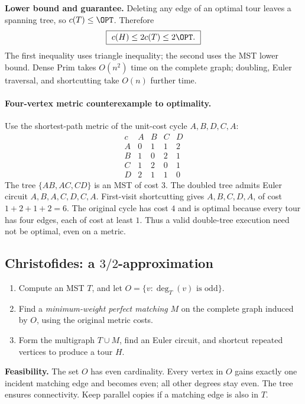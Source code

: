 \textbf{Lower bound and guarantee.} Deleting any edge of an optimal tour
leaves a spanning tree, so $c(T)\le\OPT$.  Therefore
\[
\boxed{\ c(H)\le 2c(T)\le2\OPT.\ }
\]
The first inequality uses triangle inequality; the second uses the MST lower
bound.  Dense Prim takes $O(n^2)$ time on the complete graph; doubling,
Euler traversal, and shortcutting take $O(n)$ further time.

\paragraph{Four-vertex metric counterexample to optimality.}
Use the shortest-path metric of the unit-cost cycle $A,B,D,C,A$:
\[
\begin{array}{c|rrrr}
c & A&B&C&D\\\hline
A&0&1&1&2\\
B&1&0&2&1\\
C&1&2&0&1\\
D&2&1&1&0
\end{array}
\]
The tree $\{AB,AC,CD\}$ is an MST of cost $3$.  The doubled tree admits
Euler circuit $A,B,A,C,D,C,A$.  First-visit shortcutting gives
$A,B,C,D,A$, of cost $1+2+1+2=6$.  The original cycle has cost $4$ and is
optimal because every tour has four edges, each of cost at least $1$.
Thus a valid double-tree execution need not be optimal, even on a metric.

\subsection{Christofides: a \texorpdfstring{$3/2$}{3/2}-approximation}\label{tsp:christofides}
\begin{enumerate}
  \item Compute an MST $T$, and let $O=\{v:\deg_T(v)\text{ is odd}\}$.
  \item Find a \emph{minimum-weight perfect matching} $M$ on the complete
        graph induced by $O$, using the original metric costs.
  \item Form the multigraph $T\cup M$, find an Euler circuit, and shortcut
        repeated vertices to produce a tour $H$.
\end{enumerate}
\textbf{Feasibility.} The set $O$ has even cardinality.  Every vertex in
$O$ gains exactly one incident matching edge and becomes even; all other
degrees stay even.  The tree ensures connectivity.  Keep parallel copies
if a matching edge is also in $T$.

